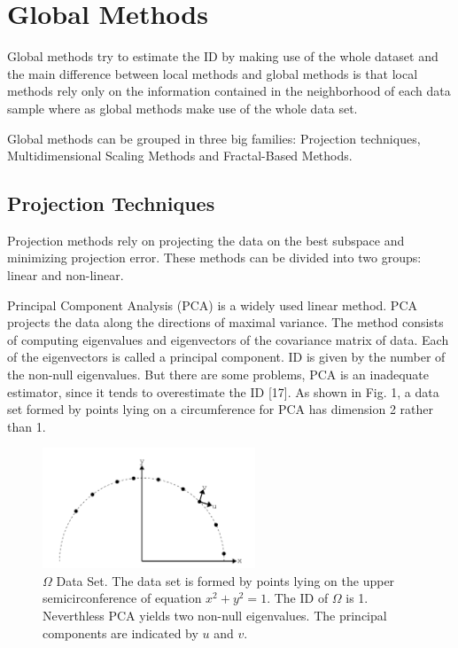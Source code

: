 \documentclass[journal]{IEEEtran}
\begin{document}
\section{Global Methods}

Global methods try to estimate the ID by making use of the whole dataset and the main difference between local methods and global methods 
is that local methods rely only on the information contained in the neighborhood of each data sample where as global methods make use of the whole data set.

Global methods can be grouped in three big families: Projection techniques, 
Multidimensional Scaling Methods and Fractal-Based Methods.

\subsection{Projection Techniques}

Projection methods rely on projecting the data on the best subspace and minimizing projection error. These methods can be divided into two groups:
linear and non-linear.

Principal Component Analysis (PCA) \cite{Kirby01, Jollife86} is a widely used linear method. 
PCA projects the data along the directions of maximal variance. The method
consists of computing eigenvalues and eigenvectors of the covariance matrix of
data. Each of the eigenvectors is called a principal component.  ID is given by
the number of the non-null eigenvalues. But there are some problems, PCA is an inadequate estimator, since it tends to overestimate the ID [17].
As shown in Fig. 1, a data set formed by points lying on a circumference for PCA has dimension 2 rather than 1.


\begin{figure}[!t]
  \centering
  \includegraphics[width=2.5in]{fig-1.png}
  \caption{\(\Omega\) Data Set. The data set is formed by points lying on the upper semicirconference 
  of equation \(x^2 + y^2 = 1\). The ID of \(\Omega\)  is 1. Neverthless PCA yields two
  non-null eigenvalues. The principal components are indicated by \(u\) and \(v\).}
  \label{fig_sim}
\end{figure}
\end{document}
